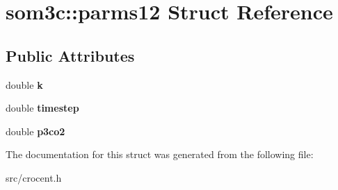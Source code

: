 \hypertarget{structsom3c_1_1parms12}{\section{som3c\-:\-:parms12 Struct Reference}
\label{structsom3c_1_1parms12}
}
\subsection*{Public Attributes}
\begin{DoxyCompactItemize}
\item 
\hypertarget{structsom3c_1_1parms12_acb4fc82ad762ed2187d6cf53fe787adb}{double {\bfseries k}}\label{structsom3c_1_1parms12_acb4fc82ad762ed2187d6cf53fe787adb}

\item 
\hypertarget{structsom3c_1_1parms12_add3569387d237e59a4f3630946c7137c}{double {\bfseries timestep}}\label{structsom3c_1_1parms12_add3569387d237e59a4f3630946c7137c}

\item 
\hypertarget{structsom3c_1_1parms12_a4a954687966e5cc6465b868425c50d2a}{double {\bfseries p3co2}}\label{structsom3c_1_1parms12_a4a954687966e5cc6465b868425c50d2a}

\end{DoxyCompactItemize}


The documentation for this struct was generated from the following file\-:\begin{DoxyCompactItemize}
\item 
src/crocent.\-h\end{DoxyCompactItemize}

